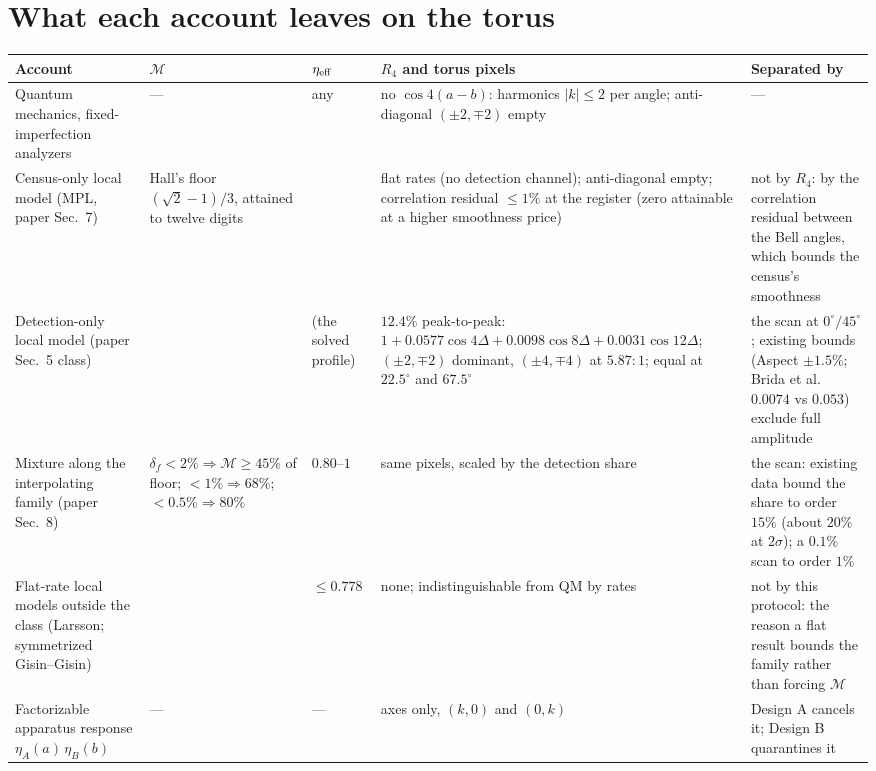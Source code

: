 \documentclass[10pt]{article}
\begin{document}
\section*{What each account leaves on the torus}
\begin{table}[H]
\footnotesize
\setlength{\tabcolsep}{4pt}\renewcommand{\arraystretch}{1.15}
\begin{tabular}{@{}>{\raggedright\arraybackslash}p{}>{\raggedright\arraybackslash}p{}>{\raggedright\arraybackslash}p{}>{\raggedright\arraybackslash}p{}>{\raggedright\arraybackslash}p{}@{}}
\toprule
Account & $\mathcal{M}$ & $\eta_{\rm eff}$ & $R_4$ and torus pixels & Separated by\\
\midrule
Quantum mechanics, fixed-imperfection analyzers & --- & any & no $\cos 4(a-b)$: harmonics $|k|\le 2$ per angle; anti-diagonal $(\pm2,\mp2)$ empty & ---\\
Census-only local model (MPL, paper Sec.~7) & Hall's floor $(\sqrt2-1)/3$, attained to twelve digits & 1 & flat rates (no detection channel); anti-diagonal empty; correlation residual $\le 1\%$ at the register (zero attainable at a higher smoothness price) & not by $R_4$: by the correlation residual between the Bell angles, which bounds the census's smoothness\\
Detection-only local model (paper Sec.~5 class) & 0 & 0.80 (the solved profile) & $12.4\%$ peak-to-peak: $1+0.0577\cos4\Delta+0.0098\cos8\Delta+0.0031\cos12\Delta$; $(\pm2,\mp2)$ dominant, $(\pm4,\mp4)$ at $5.87{:}1$; equal at $22.5^\circ$ and $67.5^\circ$ & the scan at $0^\circ/45^\circ$; existing bounds (Aspect $\pm1.5\%$; Brida et al.\ $0.0074$ vs $0.053$) exclude full amplitude\\
Mixture along the interpolating family (paper Sec.~8) & $\delta_f<2\%\Rightarrow\mathcal{M}\ge45\%$ of floor; $<1\%\Rightarrow 68\%$; $<0.5\%\Rightarrow 80\%$ & $0.80$--$1$ & same pixels, scaled by the detection share & the scan: existing data bound the share to order $15\%$ (about $20\%$ at $2\sigma$); a $0.1\%$ scan to order $1\%$\\
Flat-rate local models outside the class (Larsson; symmetrized Gisin--Gisin) & 0 & $\le 0.778$ & none; indistinguishable from QM by rates & not by this protocol: the reason a flat result bounds the family rather than forcing $\mathcal{M}$\\
\midrule
Factorizable apparatus response $\eta_A(a)\,\eta_B(b)$ & --- & --- & axes only, $(k,0)$ and $(0,k)$ & Design A cancels it; Design B quarantines it\\

\end{tabular}
\end{table}
\end{document}
